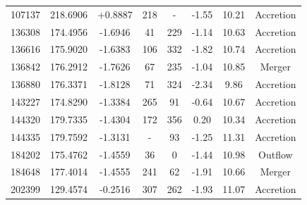 \documentclass[fleqn,usenatbib]{mnras}
\begin{document}
\begin{table}
\begin{tabular*}{\linewidth}{cccccccc}
107137                     & 218.6906            & +0.8887                & 218                             & -                         & -1.55%
& 10.21%
& Accretion     \\ 


136308                     & 174.4956            & -1.6946                & 41                             & 229                         & -1.14%
& 10.63%
& Accretion     \\ 

136616                     & 175.9020           & -1.6383                & 106                             & 332                         & -1.82%
& 10.74%
& Accretion     \\ 



136842                    & 176.2912               & -1.7626                 & 67                            & 235                         & -1.04%
& 10.85%
& Merger             \\
136880                    & 176.3371               & -1.8128                 & 71                            & 324                         & -2.34%
& 9.86%
& Accretion          \\
143227                    & 174.8290               & -1.3384                 & 265                           & 91                          & -0.64%
& 10.67%
& Accretion          \\
144320                    & 179.7335               & -1.4304                 & 172                           & 356                         & 0.20%
& 10.34%
& Accretion          \\
144335                    & 179.7592               & -1.3131                 & -                           & 93                          & -1.25%
& 11.31%
& Accretion          \\
184202                    & 175.4762               & -1.4559                 & 36                            & 0                           & -1.44%
& 10.98%
& Outflow            \\
184648                    & 177.4014               & -1.4555                 & 241                           & 62                          & -1.91%
& 10.66%
& Merger             \\
202399                    & 129.4574               & -0.2516                 & 307                           & 262                         & -1.93%
& 11.07%
& Accretion         

\end{tabular*}
\end{table}
\end{document}
